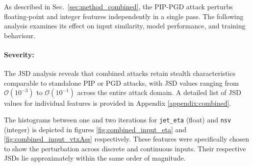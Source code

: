 As described in Sec.~\ref{sec:method_combined}, the PIP-PGD attack perturbs floating-point and integer features independently in a single pass. The following analysis examines its effect on input similarity, model performance, and training behaviour.

\paragraph{Severity:} The JSD analysis reveals that combined attacks retain stealth characteristics comparable to standalone PIP or PGD attacks, with JSD values ranging from $\mathcal{O}(10^{-3})$ to $\mathcal{O}(10^{-1})$ across the entire attack domain. A detailed list of JSD values for individual features is provided in Appendix \ref{appendix:combined}.

The histograms between one and two iterations for \texttt{jet\_eta} (float) and \texttt{nsv} (integer) is depicted in figures \ref{fig:combined_input_eta} and \ref{fig:combined_input_vtxAss} respectively. These features were specifically chosen to show the perturbation across discrete and continuous inputs. Their respective JSDs lie approximately within the same order of magnitude.

